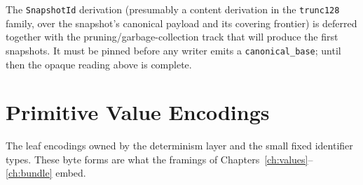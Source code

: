 \documentclass[11pt,letterpaper]{report}
\begin{document}
\begin{openquestion}
The \texttt{SnapshotId} derivation (presumably a content derivation in the
\texttt{trunc128} family, over the snapshot's canonical payload and its
covering frontier) is deferred together with the pruning/garbage-collection
track that will produce the first snapshots. It must be pinned before any
writer emits a \texttt{canonical\_base}; until then the opaque reading above
is complete.
\end{openquestion}

\chapter{Primitive Value Encodings}
\label{ch:primitives}

The leaf encodings owned by the determinism layer and the small fixed
identifier types. These byte forms are what the framings of
Chapters~\ref{ch:values}--\ref{ch:bundle} embed.
\end{document}
